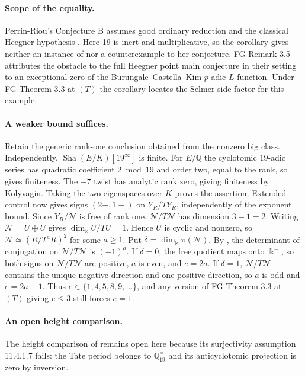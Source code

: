 \documentclass[11pt]{article}
\newcommand{\Q}{\mathbb Q}
\begin{document}
\paragraph{Scope of the equality.}
Perrin-Riou's Conjecture B assumes good ordinary reduction and the classical Heegner hypothesis \cite{PR}. Here 19 is inert and multiplicative, so the corollary gives neither an instance of nor a counterexample to her conjecture. FG Remark 3.5 attributes the obstacle to the full Heegner point main conjecture in their setting to an exceptional zero of the Burungale--Castella--Kim $p$-adic $L$-function. Under FG Theorem 3.3 at $(T)$ the corollary locates the Selmer-side factor for this example.

\paragraph{A weaker bound suffices.}
Retain the generic rank-one conclusion obtained from the nonzero big class. Independently, $\operatorname{Sha}(E/K)[19^\infty]$ is finite. For $E/\Q$ the cyclotomic $19$-adic series has quadratic coefficient $2\bmod19$ and order two, equal to the rank, so \cite[\S8.2, Algorithm 11.1(3)]{SW} gives finiteness. The $-7$ twist has analytic rank zero, giving finiteness by Kolyvagin. Taking the two eigenspaces over $K$ proves the assertion. Extended control now gives signs $(2+,1-)$ on $Y_R/TY_R$, independently of the exponent bound. Since $Y_R/\mathcal N$ is free of rank one, $\mathcal N/T\mathcal N$ has dimension $3-1=2$. Writing $\mathcal N=U\oplus U$ gives $\dim_\Bbbk U/TU=1$. Hence $U$ is cyclic and nonzero, so $\mathcal N\simeq(R/T^aR)^2$ for some $a\ge1$. Put $\delta=\dim_\Bbbk\pi(\mathcal N)$. By \cite[Lemmas 10.6.6 and 10.6.8(i), $j=a$]{Nek}, the determinant of conjugation on $\mathcal N/T\mathcal N$ is $(-1)^a$. If $\delta=0$, the free quotient maps onto $\Bbbk^-$, so both signs on $\mathcal N/T\mathcal N$ are positive, $a$ is even, and $e=2a$. If $\delta=1$, $\mathcal N/T\mathcal N$ contains the unique negative direction and one positive direction, so $a$ is odd and $e=2a-1$. Thus $e\in\{1,4,5,8,9,\ldots\}$, and any version of FG Theorem 3.3 at $(T)$ giving $e\le3$ still forces $e=1$.

\paragraph{An open height comparison.}
The height comparison of \cite[Theorem 11.4.6]{Nek} remains open here because its surjectivity assumption 11.4.1.7 fails: the Tate period belongs to $\Q_{19}^{\times}$ and its anticyclotomic projection is zero by inversion.
\end{document}
